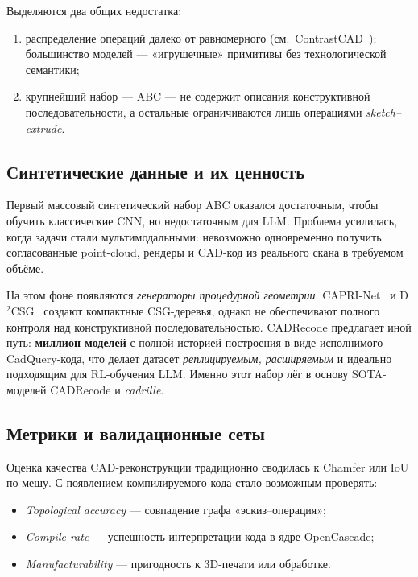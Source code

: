 Выделяются два общих недостатка:

\begin{enumerate}
	\item распределение операций далеко от равномерного
	      (см.~ContrastCAD~\cite{jung24_contrastcad}); большинство
	      моделей — «игрушечные» примитивы без технологической
	      семантики;
	\item крупнейший набор — ABC — не содержит описания конструктивной
	      последовательности, а остальные ограничиваются лишь
	      операциями \textit{sketch–extrude}.
\end{enumerate}

\subsection{Синтетические данные и их ценность}

Первый массовый синтетический набор ABC оказался достаточным,
чтобы обучить классические CNN, но недостаточным для LLM.
Проблема усилилась, когда задачи стали мультимодальными:
невозможно одновременно получить согласованные point-cloud,
рендеры и CAD-код из реального скана в требуемом объёме.

На этом фоне появляются \textit{генераторы процедурной геометрии}.
CAPRI-Net~\cite{yu21_caprinet} и D$^{2}$CSG~\cite{yu23_d2csg}
создают компактные CSG-деревья, однако не обеспечивают полного
контроля над конструктивной последовательностью. CADRecode
предлагает иной путь: \textbf{миллион моделей} с полной историей
построения в виде исполнимого CadQuery-кода, что делает датасет
\textit{реплицируемым, расширяемым} и идеально подходящим для
RL-обучения LLM. Именно этот набор лёг в основу SOTA-моделей
CADRecode и \textit{cadrille}.

\subsection{Метрики и валидационные сеты}

Оценка качества CAD-реконструкции традиционно сводилась к Chamfer
или IoU по мешу. С появлением компилируемого кода стало возможным
проверять:

\begin{itemize}
	\item \textit{Topological accuracy} — совпадение графа
	      «эскиз–операция»;
	\item \textit{Compile rate} — успешность интерпретации кода в
	      ядре OpenCascade;
	\item \textit{Manufacturability} — пригодность к 3D-печати или
	      обработке.
\end{itemize}

